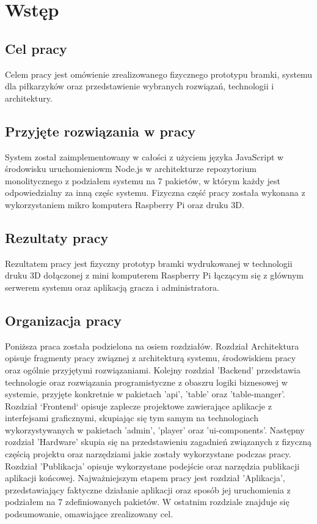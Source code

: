\chapter{Wstęp}
\label{ch:funplenop}

\section{Cel pracy}
Celem pracy jest omówienie zrealizowanego fizycznego prototypu bramki, systemu dla piłkarzyków oraz przedstawienie wybranych rozwiązań, technologii \newline i architektury.

\section{Przyjęte rozwiązania w pracy}
System został zaimplementowany w całości z użyciem języka JavaScript w środowisku uruchomieniowm Node.js w architekturze repozytorium monolitycznego z podziałem systemu na 7 pakietów, w którym każdy jest odpowiedzialny za inną częśc systemu. Fizyczna część pracy została wykonana z wykorzystaniem mikro komputera Raspberry Pi oraz druku 3D.

\section{Rezultaty pracy}
Rezultatem pracy jest fizyczny prototyp bramki wydrukowanej w technologii druku 3D dołączonej z mini komputerem Raspberry Pi łączącym się z głównym serwerem systemu oraz aplikacją gracza i administratora.

\section{Organizacja pracy}
Poniższa praca została podzielona na osiem rozdziałów. Rozdział Architektura opisuje fragmenty pracy związnej z architekturą systemu, środowiskiem pracy oraz ogólnie przyjętymi rozwiązaniami. 
Kolejny rozdział 'Backend' przedstawia technologie oraz rozwiązania programistyczne z obaszru logiki biznesowej w systemie, przyjęte konkretnie w pakietach 'api', 'table' oraz 'table-manger'.
Rozdział `Frontend` opisuje zaplecze projektowe zawierające aplikacje z interfejsami graficznymi, skupiając się tym samym na technologiach wykorzystywanych w pakietach 'admin', 'player' oraz 'ui-components'.
Następny rozdział 'Hardware' skupia się na przedstawieniu zagadnień związanych z fizyczną częścią projektu oraz narzędziami jakie zostały wykorzystane podczas pracy.
Rozdział 'Publikacja' opisuje wykorzystane podejście oraz narzędzia publikacji aplikacji końcowej.
Najważniejszym etapem pracy jest rozdział 'Aplikacja', przedstawiający faktyczne działanie aplikacji oraz sposób jej uruchomienia z podziałem na 7 zdefiniowanych pakietów.
W ostatnim rozdziale znajduje się podsumowanie, omawiające zrealizowany cel.
